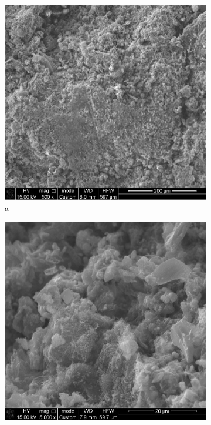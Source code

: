 \begin{figure}[H]
    \centering
    \begin{subfigure}[b]{0.32\textwidth}
        \centering
        \includegraphics[width=\textwidth,height=\textwidth]{media/chem2/image18}
        \caption*{a}
    \end{subfigure}
    \hfill
    \begin{subfigure}[b]{0.32\textwidth}
        \centering
        \includegraphics[width=\textwidth,height=\textwidth]{media/chem2/image19}

\end{subfigure}
\end{figure}
